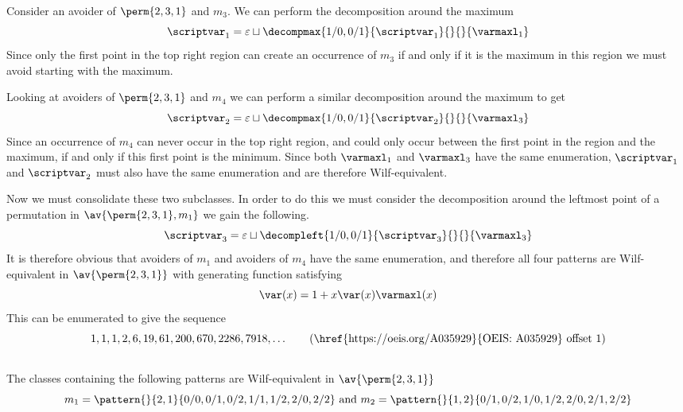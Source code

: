 Consider an avoider of \(\perm{2,3,1}\) and \(m_3\). We can perform
the decomposition around the maximum
\begin{equation*}
    \scriptvar_1 = \varepsilon \sqcup
    \decompmax{1/0,0/1}{\scriptvar_1}{}{}{\mathcal{\varmaxl}_1}
\end{equation*}
Since only the first point in the top right region can
create an occurrence of \(m_3\) if and only if it is the
maximum in this region we must avoid starting with the maximum.

Looking at avoiders of \(\perm{2,3,1}\) and \(m_4\) we
can perform a similar decomposition around the maximum to get
\begin{equation*}
    \scriptvar_2 = \varepsilon \sqcup
    \decompmax{1/0,0/1}{\scriptvar_2}{}{}{\mathcal{\varmaxl}_3}
\end{equation*}
Since an occurrence of \(m_4\) can never occur in the
top right region, and could only occur between the first point
in the region and the maximum, if and only if this first point is the minimum.
Since both \(\mathcal{\varmaxl}_1\) and \(\mathcal{\varmaxl}_3\) have the same
enumeration, \(\scriptvar_1\) and \(\scriptvar_2\) must also have
the same enumeration and are therefore Wilf-equivalent.

Now we must consolidate these two subclasses. In order to do this we must
consider the decomposition around the leftmost point of a permutation in
\(\av{\perm{2,3,1},m_1}\) we gain the following.
\begin{equation*}
    \scriptvar_3 = \varepsilon \sqcup
    \decompleft{1/0,0/1}{\scriptvar_3}{}{}{\mathcal{\varmaxl}_3}
\end{equation*}
It is therefore obvious that avoiders of \(m_1\) and avoiders of \(m_4\)
have the same enumeration, and therefore all four patterns are Wilf-equivalent
in \(\av{\perm{2,3,1}}\) with generating function satisfying
\begin{equation*}
    \var(x) = 1 + x\var(x)\varmaxl(x)
\end{equation*}
This can be enumerated to give the sequence
\begin{equation*}
    1, 1, 1, 2, 6, 19, 61, 200, 670, 2286, 7918,\dotsc \tag{\href{https://oeis.org/A035929}{OEIS: A035929} offset 1}
\end{equation*}

\subsection{}
\nextvar
The classes containing the following patterns are Wilf-equivalent
in \(\av{\perm{2,3,1}}\)
\begin{equation*}
    m_1 = \pattern{}{2,1}{0/0,0/1,0/2,
                    1/1,1/2,
                    2/0,2/2}
    \text{ and }
    m_2 = \pattern{}{1,2}{0/1,0/2,
                    1/0,1/2,
                    2/0,2/1,2/2}
\end{equation*}

